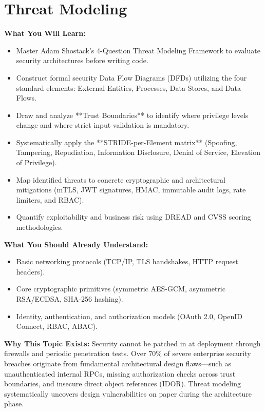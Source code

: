 \chapter{Threat Modeling}
\label{ch:threat-modeling}

\begin{chaptergoalsbox}
\textbf{What You Will Learn:}
\begin{itemize}[leftmargin=12pt]
  \item Master Adam Shostack's 4-Question Threat Modeling Framework to evaluate security architectures before writing code.
  \item Construct formal security Data Flow Diagrams (DFDs) utilizing the four standard elements: External Entities, Processes, Data Stores, and Data Flows.
  \item Draw and analyze **Trust Boundaries** to identify where privilege levels change and where strict input validation is mandatory.
  \item Systematically apply the **STRIDE-per-Element matrix** (Spoofing, Tampering, Repudiation, Information Disclosure, Denial of Service, Elevation of Privilege).
  \item Map identified threats to concrete cryptographic and architectural mitigations (mTLS, JWT signatures, HMAC, immutable audit logs, rate limiters, and RBAC).
  \item Quantify exploitability and business risk using DREAD and CVSS scoring methodologies.
\end{itemize}

\textbf{What You Should Already Understand:}
\begin{itemize}[leftmargin=12pt]
  \item Basic networking protocols (TCP/IP, TLS handshakes, HTTP request headers).
  \item Core cryptographic primitives (symmetric AES-GCM, asymmetric RSA/ECDSA, SHA-256 hashing).
  \item Identity, authentication, and authorization models (OAuth 2.0, OpenID Connect, RBAC, ABAC).
\end{itemize}

\textbf{Why This Topic Exists:}
Security cannot be patched in at deployment through firewalls and periodic penetration tests. Over 70\% of severe enterprise security breaches originate from fundamental architectural design flaws—such as unauthenticated internal RPCs, missing authorization checks across trust boundaries, and insecure direct object references (IDOR). Threat modeling systematically uncovers design vulnerabilities on paper during the architecture phase.


\end{chaptergoalsbox}
